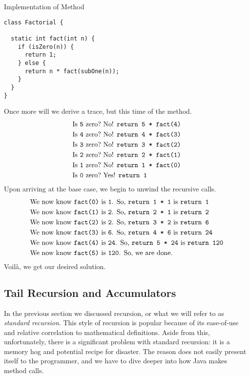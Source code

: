 \begin{cl}[]{Implementation of  Method}
\begin{lstlisting}[language=MyJava]
class Factorial {

  static int fact(int n) {
    if (isZero(n)) {
      return 1;
    } else {
      return n * fact(subOne(n));
    }
  }
}
\end{lstlisting}
\end{cl}
Once more will we derive a trace, but this time of the  method.
\begin{align*}
    \text{Is }\texttt{5} \text{ zero?} &\text{ No! }\texttt{return 5 * fact(4)}\\
    \text{Is }\texttt{4} \text{ zero?} &\text{ No! }\texttt{return 4 * fact(3)}\\
    \text{Is }\texttt{3} \text{ zero?} &\text{ No! }\texttt{return 3 * fact(2)}\\
    \text{Is }\texttt{2} \text{ zero?} &\text{ No! }\texttt{return 2 * fact(1)}\\
    \text{Is }\texttt{1} \text{ zero?} &\text{ No! }\texttt{return 1 * fact(0)}\\
    \text{Is }\texttt{0} \text{ zero?} &\text{ Yes! }\texttt{return 1}
\end{align*}
Upon arriving at the base case, we begin to unwind the recursive calls.
\begin{align*}
    &\text{We now know }\texttt{fact(0)} \text{ is }\texttt{1}\text{. So, } \texttt{return 1 * 1} \text{ is } \texttt{return 1}\\
    &\text{We now know }\texttt{fact(1)} \text{ is }\texttt{2}\text{. So, } \texttt{return 2 * 1} \text{ is } \texttt{return 2}\\
    &\text{We now know }\texttt{fact(2)} \text{ is }\texttt{2}\text{. So, } \texttt{return 3 * 2} \text{ is } \texttt{return 6}\\
    &\text{We now know }\texttt{fact(3)} \text{ is }\texttt{6}\text{. So, } \texttt{return 4 * 6} \text{ is } \texttt{return 24}\\
    &\text{We now know }\texttt{fact(4)} \text{ is }\texttt{24}\text{. So, } \texttt{return 5 * 24} \text{ is } \texttt{return 120}\\
    &\text{We now know }\texttt{fact(5)} \text{ is }\texttt{120}\text{. So, } \text{we are done.} 
\end{align*}
Voil\`a, we get our desired solution.

\subsection{Tail Recursion and Accumulators}
In the previous section we discussed recursion, or what we will refer to as \textit{standard recursion}. This style of recursion is popular because of its ease-of-use and relative correlation to mathematical definitions. Aside from this, unfortunately, there is a significant problem with standard recursion: it is a memory hog and potential recipe for disaster. The reason does not easily present itself to the programmer, and we have to dive deeper into how Java makes method calls.

